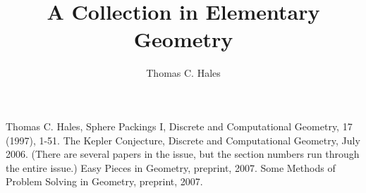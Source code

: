 \documentclass[11pt]{amsart}
\title{A Collection in Elementary Geometry}
\author{Thomas C. Hales}
\begin{document}
\maketitle

\symbolfootnote[0]{\svninfo}

 








\newpage
\begin{thebibliography}{CHMS94}
 Thomas C. Hales, Sphere Packings I,
    Discrete and Computational Geometry, 17 (1997), 1-51.
 The Kepler Conjecture, Discrete and
Computational Geometry, July 2006. (There are several papers in
the issue, but the section numbers run through the entire issue.)
 Easy Pieces in Geometry, preprint, 2007.
 Some Methods of Problem
Solving in Geometry, preprint, 2007.
\end{thebibliography}

{


}

\tableofcontents
\end{document}
